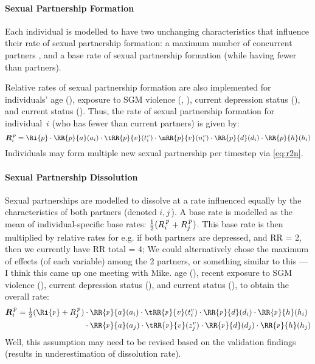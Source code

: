 \paragraph{Sexual Partnership Formation}
Each individual is modelled to have two unchanging characteristics
that influence their rate of sexual partnership formation:
a maximum number of concurrent partners , and
a base rate of sexual partnership formation 
(while having fewer than  partners).
\par
Relative rates of sexual partnership formation are also implemented for
individuals' age (),
exposure to SGM violence (, ),
current depression status (), and
current \hazdrink status ().
Thus, the rate of sexual partnership formation for individual~$i$
(who has fewer than  current partners) is given by:
\begin{equation}
  \Gi{p} = \Ri{p}
    \cdot \RR{p}{a}(a_i)
    \cdot \tRR{p}{v}(t^v_i)
    \cdot \nRR{p}{v}(n^v_i)
    \cdot \RR{p}{d}(d_i)
    \cdot \RR{p}{h}(h_i)
\end{equation}
Individuals may form multiple new sexual partnership per timestep via \eqref{eq:r2n}.
\paragraph{Sexual Partnership Dissolution}
Sexual partnerships are modelled to dissolve at a rate
influenced equally by the characteristics of both partners (denoted $i,j$\,).
A base rate is modelled as the mean of individual-specific base rates:
$\frac12(\ss R\p i + \ss R\p j)$.
This base rate is then multiplied by relative rates for
     {e.g. if both partners are depressed, and RR = 2, then we currently have RR total = 4;
      We could alternatively chose the maximum of effects (of each variable) among the 2 partners,
      or something similar to this
      --- I think this came up one meeting with Mike.}
age (),
recent exposure to SGM violence (),
current depression status (), and
current \hazdrink status (),
to obtain the overall rate:
\begin{align}
  \Gi{\p} = \textstyle\frac12 (\Ri{\p} + \ss R\p j)
   &\cdot \RR{\p}{a}(a_i)
    \cdot \tRR{\p}{v}(t^v_i)
    \cdot \RR{\p}{d}(d_i)
    \cdot \RR{\p}{h}(h_i)
    \nonumber \\
   &\cdot \RR{\p}{a}(a_j)
    \cdot \tRR{\p}{v}(z^v_j)
    \cdot \RR{\p}{d}(d_j)
    \cdot \RR{\p}{h}(h_j)
\end{align}
     {Well, this assumption may need to be revised based on the validation findings
      (results in underestimation of dissolution rate).}
